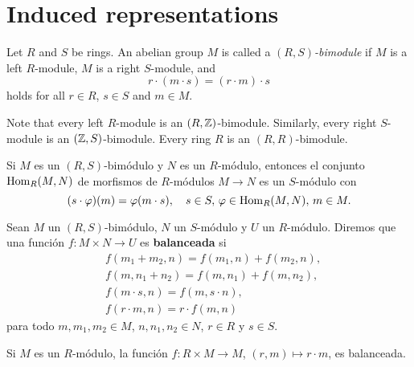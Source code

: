 \section{Induced representations}






\begin{definition}
    Let $R$ and $S$ be rings. An abelian group $M$ is called 
    a \emph{$(R,S)$-bimodule} if $M$ is a left $R$-module, 
    $M$ is a right $S$-module, and 
    \[
    r\cdot (m\cdot s)=(r\cdot m)\cdot s
    \]
    holds for all $r\in R$, $s\in S$ and $m\in M$. 
\end{definition}

Note that every left $R$-module is an $(R,\mathbb{Z})$-bimodule. Similarly, every right $S$-module is an $(\mathbb{Z},S)$-bimodule. Every 
ring $R$ is an $(R,R)$-bimodule. 

\begin{example}
Si $M$ es un $(R,S)$-bimódulo y $N$ es un $R$-módulo, entonces el conjunto 
$\operatorname{Hom}_R(M,N)$ de morfismos de $R$-módulos $M\to N$ es un 
$S$-módulo con 
\[
(s\cdot \varphi)(m)=\varphi(m\cdot s),\quad s\in S,\,\varphi\in\operatorname{Hom}_R(M,N),\,m\in M.
\]
\end{example}

Sean $M$ un $(R,S)$-bimódulo, $N$ un $S$-módulo y $U$ un $R$-módulo. 
Diremos que una función $f\colon M\times N\to U$ 
es \textbf{balanceada} si 
\begin{align*}
    &f(m_1+m_2,n)=f(m_1,n)+f(m_2,n),\\
    &f(m,n_1+n_2)=f(m,n_1)+f(m,n_2),\\
    &f(m\cdot s,n)=f(m,s\cdot n),\\
    &f(r\cdot m,n)=r\cdot f(m,n)
\end{align*}
para todo $m,m_1,m_2\in M$, $n,n_1,n_2\in N$, $r\in R$ y $s\in S$. 

\begin{example}
Si $M$ es un $R$-módulo, la función $f\colon R\times M\to M$, $(r,m)\mapsto r\cdot m$, es balanceada. 
\end{example}

